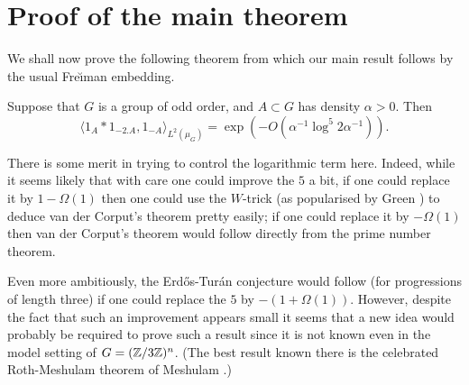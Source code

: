 \documentclass[12pt]{amsart}  %
\begin{document}
\section{Proof of the main theorem}

We shall now prove the following theorem from which our main result follows by the usual Fre{\u\i}man embedding.
\begin{theorem}\label{thm.main}
Suppose that $G$ is a group of odd order, and $A \subset G$ has density $\alpha>0$.  Then
\begin{equation*}
\langle 1_A \ast 1_{-2.A},1_{-A} \rangle_{L^2(\mu_G)} = \exp(-O(\alpha^{-1}\log^{5}2\alpha^{-1})).
\end{equation*}
\end{theorem}
There is some merit in trying to control the logarithmic term here.  Indeed, while it seems likely that with care one could improve the $5$ a bit, if one could replace it by $1-\Omega(1)$ then one could use the $W$-trick (as popularised by Green \cite{gre::8}) to deduce van der Corput's theorem pretty easily; if one could replace it by $-\Omega(1)$ then van der Corput's theorem would follow directly from the prime number theorem.

Even more ambitiously, the Erd{\H o}s-Tur{\'a}n conjecture would follow (for progressions of length three) if one could replace the $5$ by $-(1+\Omega(1))$.  However, despite the fact that such an improvement appears small it seems that a new idea would probably be required to prove such a result since it is not known even in the model setting of $G=(\mathbb{Z}/3\mathbb{Z})^n$.  (The best result known there is the celebrated Roth-Meshulam theorem of Meshulam \cite{mes::}.)
\end{document}
